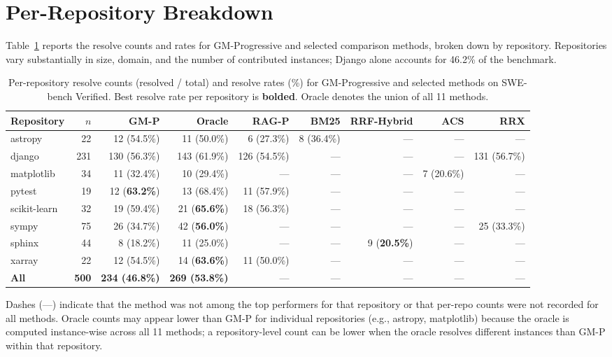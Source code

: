 \section{Per-Repository Breakdown}
\label{app:per_repo}

Table~\ref{tab:per_repo} reports the resolve counts and rates for GM-Progressive and selected comparison methods, broken down by repository.
Repositories vary substantially in size, domain, and the number of contributed instances; Django alone accounts for 46.2\% of the benchmark.

\begin{table}[t]
\centering
\caption{Per-repository resolve counts (resolved / total) and resolve rates (\%) for GM-Progressive and selected methods on SWE-bench Verified. Best resolve rate per repository is \textbf{bolded}. Oracle denotes the union of all 11 methods.}
\label{tab:per_repo}
\small
\begin{tabular}{l r r r r r r r r}
\toprule
\textbf{Repository} & \textbf{$n$} & \textbf{GM-P} & \textbf{Oracle} & \textbf{RAG-P} & \textbf{BM25} & \textbf{RRF-Hybrid} & \textbf{ACS} & \textbf{RRX} \\
\midrule
astropy       &  22 & 12 (54.5\%) & 11 (50.0\%) &  6 (27.3\%) &  8 (36.4\%) & --- & --- & --- \\
django        & 231 & 130 (56.3\%) & 143 (61.9\%) & 126 (54.5\%) & --- & --- & --- & 131 (56.7\%) \\
matplotlib    &  34 & 11 (32.4\%) & 10 (29.4\%) & --- & --- & --- &  7 (20.6\%) & --- \\
pytest        &  19 & 12 (\textbf{63.2\%}) & 13 (68.4\%) & 11 (57.9\%) & --- & --- & --- & --- \\
scikit-learn  &  32 & 19 (59.4\%) & 21 (\textbf{65.6\%}) & 18 (56.3\%) & --- & --- & --- & --- \\
sympy         &  75 & 26 (34.7\%) & 42 (\textbf{56.0\%}) & --- & --- & --- & --- & 25 (33.3\%) \\
sphinx        &  44 &  8 (18.2\%) & 11 (25.0\%) & --- & --- &  9 (\textbf{20.5\%}) & --- & --- \\
xarray        &  22 & 12 (54.5\%) & 14 (\textbf{63.6\%}) & 11 (50.0\%) & --- & --- & --- & --- \\
\midrule
\textbf{All}  & \textbf{500} & \textbf{234 (46.8\%)} & \textbf{269 (53.8\%)} & --- & --- & --- & --- & --- \\
\bottomrule
\end{tabular}
\vspace{0.5em}

\raggedright
\footnotesize{Dashes (---) indicate that the method was not among the top performers for that repository or that per-repo counts were not recorded for all methods. Oracle counts may appear lower than GM-P for individual repositories (e.g., astropy, matplotlib) because the oracle is computed instance-wise across all 11 methods; a repository-level count can be lower when the oracle resolves different instances than GM-P within that repository.}
\end{table}

